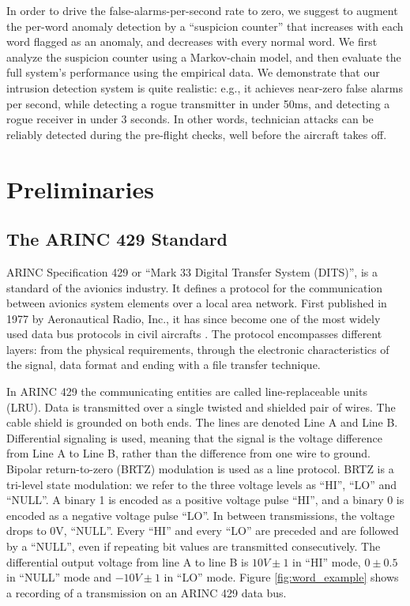 \documentclass[english]{llncs}
\newcommand{\level}[1]{\section{#1}}
\newcommand{\sublevel}[1]{\subsection{#1}}
\newcommand{\level}[1]{\chapter{#1}}
\newcommand{\sublevel}[1]{\section{#1}}
\begin{document}
  In order to drive the false-alarms-per-second rate to zero, we suggest to augment the per-word anomaly detection by a ``suspicion counter'' that increases with each word flagged as an anomaly, and decreases with every normal word. We first analyze the suspicion counter using a Markov-chain model, and then evaluate the full system's performance using the empirical data. 
  We demonstrate that our intrusion detection system is quite realistic: e.g., it achieves near-zero false alarms per second, while detecting a rogue transmitter in under 50ms, and detecting a rogue receiver in under 3 seconds. In other words, technician attacks can be reliably detected during the pre-flight checks, well before the aircraft takes off.
  
\vspace*{-1ex} %
\level{Preliminaries} \label{Preliminaries}
\sublevel{The ARINC 429 Standard}
  ARINC Specification 429 \cite{arinc2004arinc429} or ``Mark 33 Digital Transfer System (DITS)'', is a standard of the avionics industry. It defines a protocol for the communication between avionics system elements over a local area network. First published in 1977 by Aeronautical Radio, Inc., it has since become one of the most widely used data bus protocols in civil aircrafts \cite{MoirIan2013DBN}. The protocol encompasses different layers: from the physical requirements, through the electronic characteristics of the signal, data format and ending with a file transfer technique.

  In ARINC 429 the communicating entities are called line-replaceable units (LRU). Data is transmitted over a single twisted and shielded pair of wires. The cable shield is grounded on both ends. The lines are denoted Line A and Line B. Differential signaling is used, meaning that the signal is the voltage difference from Line A to Line B, rather than the difference from one wire to ground. Bipolar return-to-zero (BRTZ) modulation is used as a line protocol. BRTZ is a tri-level state modulation: we refer to the three voltage levels as ``HI'', ``LO'' and ``NULL''. A binary 1 is encoded as a positive voltage pulse ``HI'', and a binary 0 is encoded as a negative voltage pulse ``LO''. In between transmissions, the voltage drops to 0V, ``NULL''. Every ``HI'' and every ``LO'' are preceded and are followed by a ``NULL'', even if repeating bit values are transmitted consecutively. The differential output voltage from line A to line B is $10V \pm 1$ in ``HI'' mode, $0 \pm 0.5$ in ``NULL'' mode and $-10V \pm 1$ in ``LO'' mode.  Figure \ref{fig:word_example} shows a recording of a transmission on an ARINC 429 data bus.
  
\end{document}
